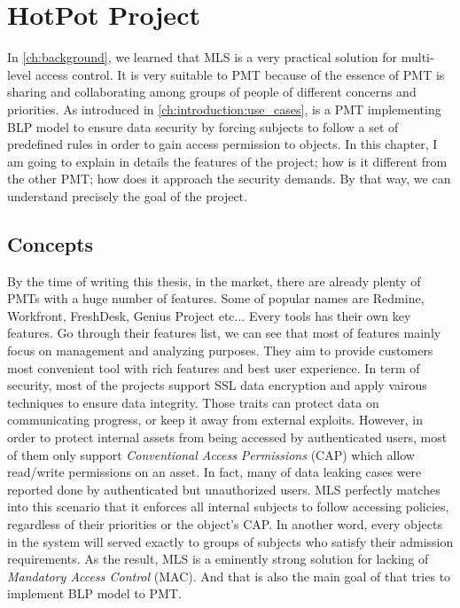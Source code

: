 
\chapter{HotPot Project} %

\label{ch:hopot_project} %


In \autoref{ch:background}, we learned that MLS is a very practical solution for multi-level access control.
It is very suitable to PMT because of the essence of PMT is sharing and collaborating among groups of people of different concerns and priorities.
As introduced in \autoref{ch:introduction:use_cases}, \myProject is a PMT implementing BLP model to ensure data security by forcing subjects to follow a set of predefined rules in order to gain access permission to objects.
In this chapter, I am going to explain in details the features of the project; how is it different from the other PMT; how does it approach the security demands.
By that way, we can understand precisely the goal of the project.


\section{Concepts}
\label{ch:hopot_project:concepts}

By the time of writing this thesis, in the market, there are already plenty of PMTs with a huge number of features.
Some of popular names are Redmine, Workfront, FreshDesk, Genius Project etc...
Every tools has their own key features.
Go through their features list, we can see that most of features mainly focus on management and analyzing purposes.
They aim to provide customers most convenient tool with rich features and best user experience.
In term of security, most of the projects support SSL data encryption and apply vairous techniques to ensure data integrity.
Those traits can protect data on communicating progress, or keep it away from external exploits.
However, in order to protect internal assets from being accessed by authenticated users, most of them only support \emph{Conventional Access Permissions} (CAP) which allow read/write permissions on an asset.
In fact, many of data leaking cases were reported done by authenticated but unauthorized users.
MLS perfectly matches into this scenario that it enforces all internal subjects to follow accessing policies, regardless of their priorities or the object's CAP.
In another word, every objects in the system will served exactly to groups of subjects who satisfy their admission requirements.
As the result, MLS is a eminently strong solution for lacking of \emph{Mandatory Access Control} (MAC).
And that is also the main goal of \myProject that tries to implement BLP model to PMT.

